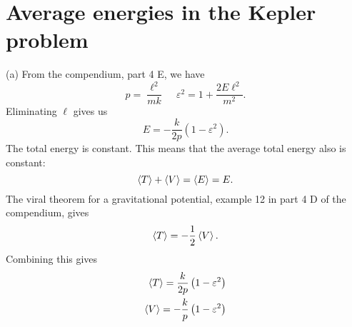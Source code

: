 \documentclass{article}
\begin{document}
    \section{Average energies in the Kepler problem}
        (a) From the compendium, part 4 E, we have 
        \begin{equation*}
            p = \frac{\ell^2}{m k}\, \quad \varepsilon^2 = 1 + \frac{2 E \ell^2}{m ^2}.
        \end{equation*}
        Eliminating $\ell$ gives us 
        \begin{equation*}
            E = - \frac{k}{2 p} \left(1 - \varepsilon^2\right).
        \end{equation*}
        The total energy is constant. This means that the average total energy also is constant:
        \begin{equation*}
            \expval{T} + \expval{V} = \expval{E} = E.
        \end{equation*}
        The viral theorem for a gravitational potential, example 12 in part 4 D of the compendium, gives
        \begin{equation*}
            \expval{T} = - \frac{1}{2} \expval{V}.
        \end{equation*}
        Combining this gives
        \begin{align*}
            \expval{T} = \frac{k}{2 p} \left(1 - \varepsilon^2\right) \\
            \expval{V} = - \frac{k}{p} \left(1 - \varepsilon^2\right)
        \end{align*}
\end{document}

